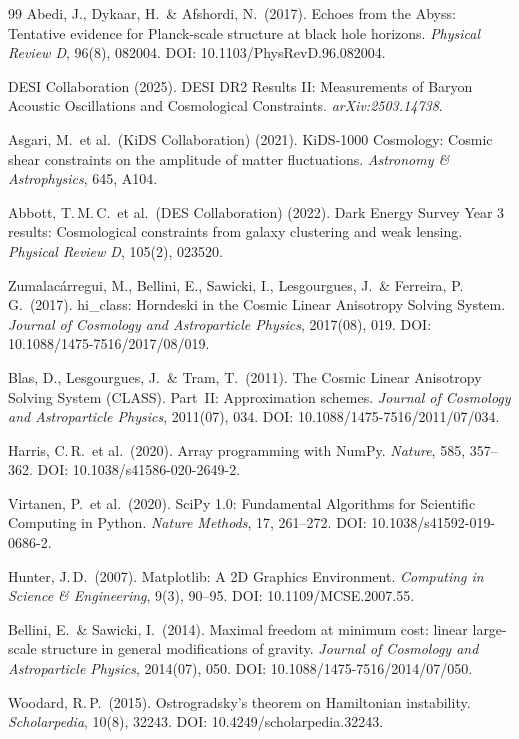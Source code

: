 \documentclass[11pt,a4paper]{article}
\begin{document}
\begin{thebibliography}{99}
Abedi, J., Dykaar, H.\ \& Afshordi, N.\ (2017).
Echoes from the Abyss: Tentative evidence for Planck-scale structure at black hole horizons.
\textit{Physical Review D}, 96(8), 082004.
DOI: 10.1103/PhysRevD.96.082004.

DESI Collaboration (2025).
DESI DR2 Results II: Measurements of Baryon Acoustic Oscillations and Cosmological Constraints.
\textit{arXiv:2503.14738}.

Asgari, M.\ et al.\ (KiDS Collaboration) (2021).
KiDS-1000 Cosmology: Cosmic shear constraints on the amplitude of matter fluctuations.
\textit{Astronomy \& Astrophysics}, 645, A104.

Abbott, T.\,M.\,C.\ et al.\ (DES Collaboration) (2022).
Dark Energy Survey Year 3 results: Cosmological constraints from galaxy clustering and weak lensing.
\textit{Physical Review D}, 105(2), 023520.

Zumalac\'arregui, M., Bellini, E., Sawicki, I., Lesgourgues, J.\ \& Ferreira, P.\,G.\ (2017).
hi\_class: Horndeski in the Cosmic Linear Anisotropy Solving System.
\textit{Journal of Cosmology and Astroparticle Physics}, 2017(08), 019.
DOI: 10.1088/1475-7516/2017/08/019.

Blas, D., Lesgourgues, J.\ \& Tram, T.\ (2011).
The Cosmic Linear Anisotropy Solving System (CLASS). Part~II: Approximation schemes.
\textit{Journal of Cosmology and Astroparticle Physics}, 2011(07), 034.
DOI: 10.1088/1475-7516/2011/07/034.

Harris, C.\,R.\ et al.\ (2020).
Array programming with NumPy.
\textit{Nature}, 585, 357--362.
DOI: 10.1038/s41586-020-2649-2.

Virtanen, P.\ et al.\ (2020).
SciPy 1.0: Fundamental Algorithms for Scientific Computing in Python.
\textit{Nature Methods}, 17, 261--272.
DOI: 10.1038/s41592-019-0686-2.

Hunter, J.\,D.\ (2007).
Matplotlib: A 2D Graphics Environment.
\textit{Computing in Science \& Engineering}, 9(3), 90--95.
DOI: 10.1109/MCSE.2007.55.

Bellini, E.\ \& Sawicki, I.\ (2014).
Maximal freedom at minimum cost: linear large-scale structure in general modifications of gravity.
\textit{Journal of Cosmology and Astroparticle Physics}, 2014(07), 050.
DOI: 10.1088/1475-7516/2014/07/050.

Woodard, R.\,P.\ (2015).
Ostrogradsky's theorem on Hamiltonian instability.
\textit{Scholarpedia}, 10(8), 32243.
DOI: 10.4249/scholarpedia.32243.


\end{thebibliography}
\end{document}
